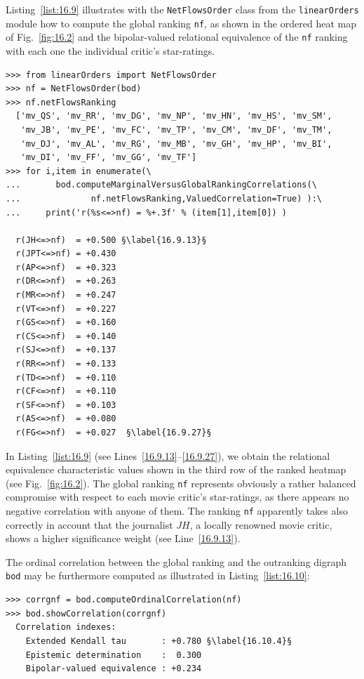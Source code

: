 Listing~\vref{list:16.9} illustrates with the \texttt{NetFlowsOrder} class  from the \texttt{linearOr\-ders} module how to compute the global \NetFlows ranking \texttt{nf}, as shown in the ordered heat map of Fig.~\vref{fig:16.2} and the bipolar-valued relational equivalence of the \texttt{nf} ranking with each one the individual critic's star-ratings.
\begin{lstlisting}[caption={Computing marginal criterion correlations with global \NetFlows ranking},label=list:16.9]
>>> from linearOrders import NetFlowsOrder
>>> nf = NetFlowsOrder(bod)
>>> nf.netFlowsRanking
  ['mv_QS', 'mv_RR', 'mv_DG', 'mv_NP', 'mv_HN', 'mv_HS', 'mv_SM',
   'mv_JB', 'mv_PE', 'mv_FC', 'mv_TP', 'mv_CM', 'mv_DF', 'mv_TM',
   'mv_DJ', 'mv_AL', 'mv_RG', 'mv_MB', 'mv_GH', 'mv_HP', 'mv_BI',
   'mv_DI', 'mv_FF', 'mv_GG', 'mv_TF']
>>> for i,item in enumerate(\
...       bod.computeMarginalVersusGlobalRankingCorrelations(\
...              nf.netFlowsRanking,ValuedCorrelation=True) ):\
...     print('r(%s<=>nf) = %+.3f' % (item[1],item[0]) )   

  r(JH<=>nf)  = +0.500 §\label{16.9.13}§
  r(JPT<=>nf) = +0.430
  r(AP<=>nf)  = +0.323
  r(DR<=>nf)  = +0.263
  r(MR<=>nf)  = +0.247
  r(VT<=>nf)  = +0.227
  r(GS<=>nf)  = +0.160
  r(CS<=>nf)  = +0.140
  r(SJ<=>nf)  = +0.137
  r(RR<=>nf)  = +0.133
  r(TD<=>nf)  = +0.110
  r(CF<=>nf)  = +0.110
  r(SF<=>nf)  = +0.103
  r(AS<=>nf)  = +0.080
  r(FG<=>nf)  = +0.027  §\label{16.9.27}§
\end{lstlisting}

In Listing~\vref{list:16.9} (see Lines~\ref{16.9.13}--\ref{16.9.27}), we obtain the relational equivalence characteristic values shown in the third row of the ranked heatmap (see Fig.~\vref{fig:16.2}). The global \NetFlows ranking \texttt{nf} represents obviously a rather balanced compromise with respect to each movie critic's star-ratings, as there appears no negative correlation with anyone of them. The ranking \texttt{nf} apparently takes also correctly in account that the journalist $JH$, a locally renowned movie critic, shows a higher significance weight (see Line~\ref{16.9.13}).

The ordinal correlation between the global \NetFlows ranking and the outranking digraph \texttt{bod} may be furthermore computed as illustrated in Listing~\vref{list:16.10}: 
\begin{lstlisting}[caption={Computing the ordinal correlation between \NetFlows and global outranking digraph},label=list:16.10]
>>> corrgnf = bod.computeOrdinalCorrelation(nf)
>>> bod.showCorrelation(corrgnf)
  Correlation indexes:
    Extended Kendall tau       : +0.780 §\label{16.10.4}§
    Epistemic determination    :  0.300
    Bipolar-valued equivalence : +0.234
\end{lstlisting}

